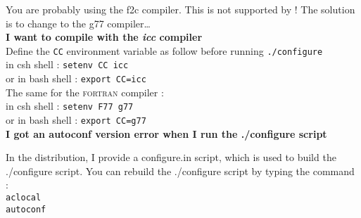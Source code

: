 You are probably using the f2c compiler. This is not supported by
\lenstool! The solution is to change to the g77 compiler\ldots\\

\textbf{I want to compile with the \emph{icc} compiler}\\

Define the \verb+CC+ environment variable as follow before running \verb+./configure+ \\
in csh shell : \verb+setenv CC icc+ \\
or in bash shell : \verb+export CC=icc+ \\

The same for the \textsc{fortran} compiler : \\
in csh shell : \verb+setenv F77 g77+ \\
or in bash shell : \verb+export CC=g77+ \\ 

\textbf{I got an autoconf version error when I run the ./configure script}

In the distribution, I provide a configure.in script, which is used to
build the ./configure script. You can rebuild the ./configure script
by typing the command : \\
\verb+aclocal+ \\
\verb+autoconf+ \\
